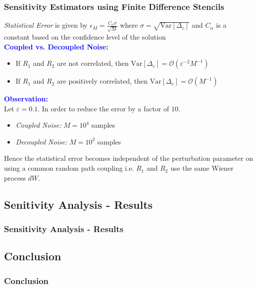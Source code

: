 \documentclass[a4paper,10pt]{beamer}
\newcommand{\sqb}[1]{\left[ #1 \right]}
\newcommand{\rb}[1]{\left( #1 \right)}
\begin{document}
	\begin{frame}
		\frametitle{\large Sensitivity Estimators using Finite Difference Stencils}
		\textit{Statistical Error} is given by $\epsilon_{M} = \frac{C_{\alpha} \sigma}{\sqrt{M}}$ where $\sigma = \sqrt{\text{Var}\sqb{\Delta_{c}}}$ and $C_{\alpha}$ is a constant based on the confidence level of the solution \\
		\vspace{0.15cm}
		\textcolor{blue}{\textbf{Coupled vs. Decoupled Noise:}}
		\begin{itemize}
			\item {If $R_{1}$ and $R_{2}$ are not correlated, then $\text{Var}\sqb{\Delta_{c}} = \mathcal{O}\rb{\varepsilon^{-2} M^{-1}}$}
			\item {If $R_{1}$ and $R_{2}$ are positively correlated, then $\text{Var}\sqb{\Delta_{c}} = \mathcal{O}\rb{M^{-1}}$}
		\end{itemize}
		\textcolor{blue}{\textbf{Observation:}} \\
		Let $\varepsilon = 0.1$. In order to reduce the error by a factor of $10$.
		\begin{itemize}
			\item {\textit{Coupled Noise:} $M = 10^{4}$ samples}
			\item {\textit{Decoupled Noise:} $M = 10^{2}$ samples}
		\end{itemize}
		Hence the statistical error becomes independent of the perturbation parameter on using a common random path coupling i.e. $R_{1}$ and $R_{2}$ use the same Wiener process $dW$.
	\end{frame}

	\begin{frame}
		\subsection{Senitivity Analysis - Results}
		\frametitle{Sensitivity Analysis - Results}
		
	\end{frame}

	\begin{frame}
		\section{Conclusion}
		\frametitle{Conclusion}
	\end{frame}
\end{document}

